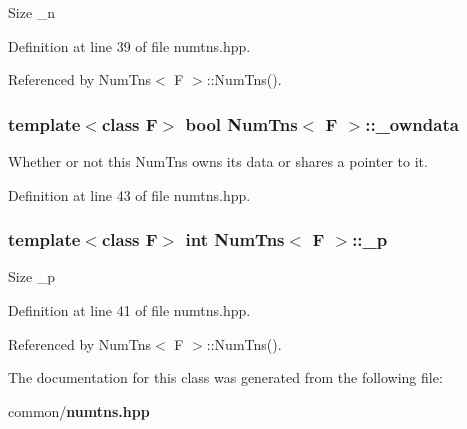 Size \_\-n 

Definition at line 39 of file numtns.hpp.

Referenced by Num\-Tns$<$ F $>$::Num\-Tns().
\subsubsection{\setlength{\rightskip}{0pt plus 5cm}template$<$class F$>$ bool {\bf Num\-Tns}$<$ F $>$::{\bf \_\-owndata}}\label{classNumTns_4a613b2956a4a0ffff962e497a5d56e0_4a613b2956a4a0ffff962e497a5d56e0}


Whether or not this Num\-Tns owns its data or shares a pointer to it. 

Definition at line 43 of file numtns.hpp.
\subsubsection{\setlength{\rightskip}{0pt plus 5cm}template$<$class F$>$ int {\bf Num\-Tns}$<$ F $>$::{\bf \_\-p}}\label{classNumTns_3b294e0c5d0f27989f6d4c274ecccab0_3b294e0c5d0f27989f6d4c274ecccab0}


Size \_\-p 

Definition at line 41 of file numtns.hpp.

Referenced by Num\-Tns$<$ F $>$::Num\-Tns().

The documentation for this class was generated from the following file:\begin{CompactItemize}
\item 
common/{\bf numtns.hpp}\end{CompactItemize}
